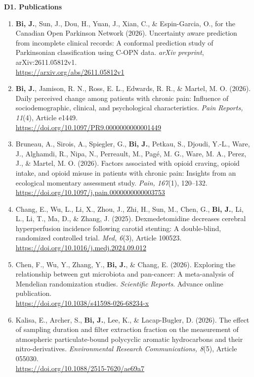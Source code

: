 \documentclass[10pt]{article}
\newcommand{\cvsubsection}[1]{%
  \Needspace{4\baselineskip}%
  \vspace{0.3em}%
  {\bfseries #1}\par
}
\begin{document}
\cvsubsection{D1. Publications}
\begin{enumerate}[leftmargin=1.6em]
\item \textbf{Bi, J.}, Sun, J., Dou, H., Yuan, J., Xian, C., \& Espin-Garcia, O., for the Canadian Open Parkinson Network (2026). Uncertainty aware prediction from incomplete clinical records: A conformal prediction study of Parkinsonian classification using C-OPN data. \emph{arXiv preprint}, arXiv:2611.05812v1.\\
\url{https://arxiv.org/abs/2611.05812v1}

\item \textbf{Bi, J.}, Jamison, R. N., Ross, E. L., Edwards, R. R., \& Martel, M. O. (2026). Daily perceived change among patients with chronic pain: Influence of sociodemographic, clinical, and psychological characteristics. \emph{Pain Reports, 11}(4), Article e1449.\\
\url{https://doi.org/10.1097/PR9.0000000000001449}

\item Bruneau, A., Sirois, A., Spiegler, G., \textbf{Bi, J.}, Petkau, S., Djoudi, Y.-L., Ware, J., Alghamdi, R., Nipa, N., Perreault, M., Pag\'{e}, M. G., Ware, M. A., Perez, J., \& Martel, M. O. (2026). Factors associated with opioid craving, opioid intake, and opioid misuse in patients with chronic pain: Insights from an ecological momentary assessment study. \emph{Pain, 167}(1), 120--132.\\
\url{https://doi.org/10.1097/j.pain.0000000000003753}

\item Chang, E., Wu, L., Li, X., Zhou, J., Zhi, H., Sun, M., Chen, G., \textbf{Bi, J.}, Li, L., Li, T., Ma, D., \& Zhang, J. (2025). Dexmedetomidine decreases cerebral hyperperfusion incidence following carotid stenting: A double-blind, randomized controlled trial. \emph{Med, 6}(3), Article 100523.\\
\url{https://doi.org/10.1016/j.medj.2024.09.012}

\item Chen, F., Wu, Y., Zhang, Y., \textbf{Bi, J.}, \& Chang, E. (2026). Exploring the relationship between gut microbiota and pan-cancer: A meta-analysis of Mendelian randomization studies. \emph{Scientific Reports}. Advance online publication.\\
\url{https://doi.org/10.1038/s41598-026-68234-x}

\item Kalisa, E., Archer, S., \textbf{Bi, J.}, Lee, K., \& Lacap-Bugler, D. (2026). The effect of sampling duration and filter extraction fraction on the measurement of atmospheric particulate-bound polycyclic aromatic hydrocarbons and their nitro-derivatives. \emph{Environmental Research Communications, 8}(5), Article 055030.\\
\url{https://doi.org/10.1088/2515-7620/ae69a7}


\end{enumerate}
\end{document}

